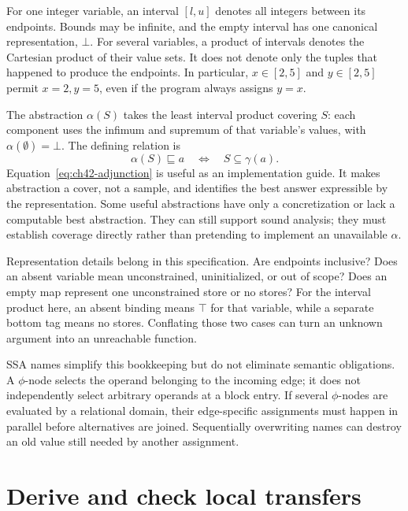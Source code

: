 For one integer variable, an interval $[l,u]$ denotes all integers between its endpoints.
Bounds may be infinite, and the empty interval has one canonical representation, $\bot$.
For several variables, a product of intervals denotes the Cartesian product of their value sets.
It does not denote only the tuples that happened to produce the endpoints.
In particular, $x\in[2,5]$ and $y\in[2,5]$ permit $x=2,y=5$, even if the program always assigns $y=x$.

The abstraction $\alpha(S)$ takes the least interval product covering $S$: each component uses the infimum and supremum of that variable's values, with $\alpha(\emptyset)=\bot$.
The defining relation is
\begin{equation}
 \alpha(S)\sqsubseteq a\quad\Longleftrightarrow\quad S\subseteq\gamma(a).
 \label{eq:ch42-adjunction}
\end{equation}
Equation~\ref{eq:ch42-adjunction} is useful as an implementation guide.
It makes abstraction a cover, not a sample, and identifies the best answer expressible by the representation.
Some useful abstractions have only a concretization or lack a computable best abstraction.
They can still support sound analysis; they must establish coverage directly rather than pretending to implement an unavailable $\alpha$.

Representation details belong in this specification.
Are endpoints inclusive?
Does an absent variable mean unconstrained, uninitialized, or out of scope?
Does an empty map represent one unconstrained store or no stores?
For the interval product here, an absent binding means $\top$ for that variable, while a separate bottom tag means no stores.
Conflating those two cases can turn an unknown argument into an unreachable function.

SSA names simplify this bookkeeping but do not eliminate semantic obligations.
A $\phi$-node selects the operand belonging to the incoming edge; it does not independently select arbitrary operands at a block entry.
If several $\phi$-nodes are evaluated by a relational domain, their edge-specific assignments must happen in parallel before alternatives are joined.
Sequentially overwriting names can destroy an old value still needed by another assignment.

\section{Derive and check local transfers}
\label{sec:ch42-local-soundness}

